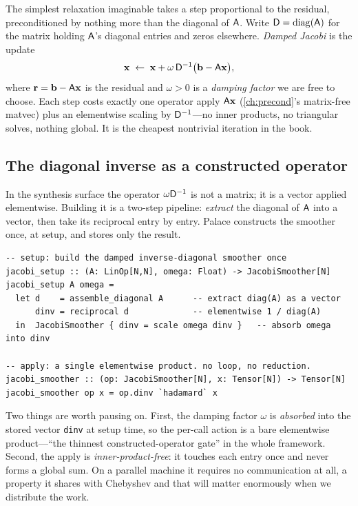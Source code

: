 The simplest relaxation imaginable takes a step proportional to the residual,
preconditioned by nothing more than the diagonal of $\mathsf{A}$. Write
$\mathsf{D} = \operatorname{diag}(\mathsf{A})$ for the matrix holding $\mathsf{A}$'s
diagonal entries and zeros elsewhere. \emph{Damped Jacobi} is the update
\begin{equation}
  \mathbf{x} \;\leftarrow\; \mathbf{x} + \omega\,\mathsf{D}^{-1}\bigl(\mathbf{b} - \mathsf{A}\mathbf{x}\bigr),
  \label{eq:smoo-jac-update}
\end{equation}
where $\mathbf{r} = \mathbf{b} - \mathsf{A}\mathbf{x}$ is the residual and $\omega>0$ is a \emph{damping
factor} we are free to choose. Each step costs exactly one operator apply
$\mathsf{A}\mathbf{x}$ (\cref{ch:precond}'s matrix-free matvec) plus an elementwise scaling
by $\mathsf{D}^{-1}$---no inner products, no triangular solves, nothing global. It is
the cheapest nontrivial iteration in the book.

\subsection{The diagonal inverse as a constructed operator}

In the synthesis surface the operator $\omega\mathsf{D}^{-1}$ is not a matrix; it is a
vector applied elementwise. Building it is a two-step pipeline: \emph{extract} the
diagonal of $\mathsf{A}$ into a vector, then take its reciprocal entry by entry.
Palace constructs the smoother once, at setup, and stores only the result.

\begin{lstlisting}[style=l4style]
-- setup: build the damped inverse-diagonal smoother once
jacobi_setup :: (A: LinOp[N,N], omega: Float) -> JacobiSmoother[N]
jacobi_setup A omega =
  let d    = assemble_diagonal A      -- extract diag(A) as a vector
      dinv = reciprocal d             -- elementwise 1 / diag(A)
  in  JacobiSmoother { dinv = scale omega dinv }   -- absorb omega into dinv

-- apply: a single elementwise product. no loop, no reduction.
jacobi_smoother :: (op: JacobiSmoother[N], x: Tensor[N]) -> Tensor[N]
jacobi_smoother op x = op.dinv `hadamard` x
\end{lstlisting}

Two things are worth pausing on. First, the damping factor $\omega$ is
\emph{absorbed} into the stored vector \lstinline[style=l4style]|dinv| at setup
time, so the per-call action is a bare elementwise product---``the thinnest
constructed-operator gate'' in the whole framework. Second, the apply is
\emph{inner-product-free}: it touches each entry once and never forms a global sum.
On a parallel machine it requires no communication at all, a property it shares
with Chebyshev and that will matter enormously when we distribute the work.


